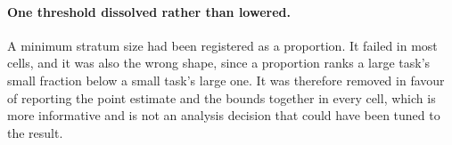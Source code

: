 \documentclass[conference]{IEEEtran}
\begin{document}
\paragraph{One threshold dissolved rather than lowered.} A minimum stratum size had been
registered as a proportion. It failed in most cells, and it was also the wrong shape,
since a proportion ranks a large task's small fraction below a small task's large one. It
was therefore removed in favour of reporting the point estimate and the bounds together in
every cell, which is more informative and is not an analysis decision that could have been
tuned to the result.

\end{document}
